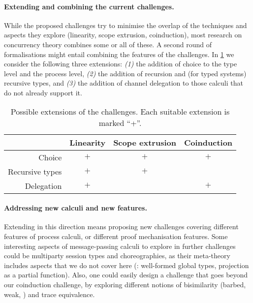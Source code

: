 \documentclass[runningheads]{llncs}
\begin{document}
\paragraph{Extending and combining the current challenges.}
While the proposed challenges try to minimise the overlap of the techniques
and aspects they explore (linearity, scope extrusion, coinduction), most
research on concurrency theory combines some or all of these. A second round of formalisations might
entail combining the features of the challenges.
In \cref{tab:extensions} we consider the following three extensions:
\emph{(1)} the addition of choice to the type level and the process level,
\emph{(2)} the addition of recursion and (for typed systems) recursive types,
and \emph{(3)} the
addition of channel delegation to those calculi that do not already
support it.

\begin{table}[btp]
  \caption{Possible extensions of the challenges. Each suitable extension is marked ``+''. \label{tab:extensions} \\}
  \begin{center}\small
    \vspace{-4mm}%
    \begin{tabular}{|r|c|c|c|}
      \hline
      & Linearity & Scope extrusion & Coinduction \\
      \hline
      Choice & $+$ & $+$  & $+$ \\
      \hline
      Recursive types & $+$  & $+$ & \\
      \hline
      Delegation & $+$ & & $+$ \\
      \hline
    \end{tabular}
    \vspace{-3mm}%
  \end{center}
\end{table}

\vspace{-1mm}%
\paragraph{Addressing new calculi and new features.}
Extending in this direction
means proposing new challenges covering different features of
process calculi, or different proof mechanisation features.
Some interesting aspects of message-passing calculi to explore in
further challenges could be multiparty session types and
choreographies, as their meta-theory includes aspects
that we do not cover here (\eg: well-formed global types,
projection as a partial function). Also, one could easily
design a challenge that goes beyond our coinduction challenge, by
exploring different notions of bisimilarity (barbed, weak, \etc)
and trace equivalence.
\end{document}

